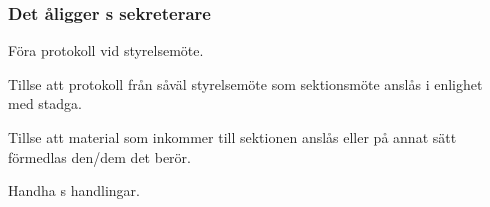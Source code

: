 \subsubsection{Det åligger \STYRIT{}s sekreterare}
	\begin{att}
	\item Föra protokoll vid styrelsemöte.
	\item Tillse att protokoll från såväl styrelsemöte som sektionsmöte anslås i enlighet med stadga.
	\item Tillse att material som inkommer till sektionen anslås eller på annat sätt förmedlas den/dem det berör.
	\item Handha \STYRIT{}s handlingar.
\end{att}